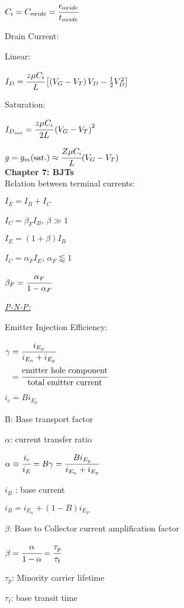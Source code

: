 \documentclass{article}
\newcommand{\sect}[1]{\noindent\textbf{#1}\\}
\begin{document}
{\begin{multicols*}{2}
		$C_i = C_{oxide} = \cfrac{\epsilon_{oxide}}{t_{oxide}}$ 
		
		\noindent Drain Current:
		
		Linear:
		
		$I_D = \cfrac{z\mu C_i}{L} \left[ \left( V_G - V_T \right) V_D - \frac{1}{2} V_D^2 \right]$
		
		Saturation:
		
		$I_{D_{sat}} = \cfrac{z \mu C_i}{2L} \left(V_G-V_T\right)^2$
		
		$g = g_m(\text{sat.}) \approx \cfrac{Z\mu C_i}{L} (V_G - V_T)$\\
		
		\sect{Chapter 7: BJTs}
		
		\noindent Relation between terminal currents:
		
		$I_E = I_B + I_C$
		
		$I_C = \beta_F I_B$, $\beta \gg 1$
		
		$I_E = (1+\beta) I_B$
		
		$I_C = \alpha_F I_E$, $\alpha_F \lessapprox 1$
		
		$\beta_F = \cfrac{\alpha_F}{1-\alpha_F}$
		
		\noindent\underline{\textit{P-N-P:}}
		
		\noindent Emitter Injection Efficiency:
		
		$\begin{aligned}
			\gamma &= \cfrac{i_{E_p}}{i_{E_n} + i_{E_p}} \\
			&= \cfrac{\text{emitter hole component}}{\text{total emitter current}}
		\end{aligned}$
		
		$i_c = B i_{E_p}$
		
		\noindent B: Base transport factor
		
		\noindent $\alpha$: current transfer ratio
		
		$\alpha \equiv \cfrac{i_c}{i_E} = B\gamma = \cfrac{Bi_{E_p}}{i_{E_n} + i_{E_p}}$
		
		\noindent $i_B$ : base current
		
		$i_B = i_{E_n} + (1-B) i_{E_P}$
		
		\noindent $\beta$: Base to Collector current amplification factor
		
		$\beta = \cfrac{\alpha}{1-\alpha} = \cfrac{\tau_p}{\tau_t}$
		
		\noindent $\tau_p$: Minority carrier lifetime
		
		\noindent $\tau_t$: base transit time
		

\end{multicols*}}
\end{document}
